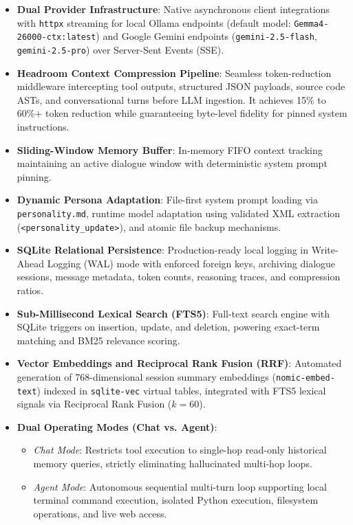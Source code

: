 \begin{itemize}
    \item \textbf{Dual Provider Infrastructure}: Native asynchronous client integrations with \texttt{httpx} streaming for local Ollama endpoints (default model: \texttt{Gemma4-26000-ctx:latest}) and Google Gemini endpoints (\texttt{gemini-2.5-flash}, \texttt{gemini-2.5-pro}) over Server-Sent Events (SSE).
    \item \textbf{Headroom Context Compression Pipeline}: Seamless token-reduction middleware intercepting tool outputs, structured JSON payloads, source code ASTs, and conversational turns before LLM ingestion. It achieves 15\% to 60\%+ token reduction while guaranteeing byte-level fidelity for pinned system instructions.
    \item \textbf{Sliding-Window Memory Buffer}: In-memory FIFO context tracking maintaining an active dialogue window with deterministic system prompt pinning.
    \item \textbf{Dynamic Persona Adaptation}: File-first system prompt loading via \texttt{personality.md}, runtime model adaptation using validated XML extraction (\texttt{<personality\_update>}), and atomic file backup mechanisms.
    \item \textbf{SQLite Relational Persistence}: Production-ready local logging in Write-Ahead Logging (WAL) mode with enforced foreign keys, archiving dialogue sessions, message metadata, token counts, reasoning traces, and compression ratios.
    \item \textbf{Sub-Millisecond Lexical Search (FTS5)}: Full-text search engine with SQLite triggers on insertion, update, and deletion, powering exact-term matching and BM25 relevance scoring.
    \item \textbf{Vector Embeddings and Reciprocal Rank Fusion (RRF)}: Automated generation of 768-dimensional session summary embeddings (\texttt{nomic-embed-text}) indexed in \texttt{sqlite-vec} virtual tables, integrated with FTS5 lexical signals via Reciprocal Rank Fusion ($k=60$).
    \item \textbf{Dual Operating Modes (Chat vs. Agent)}:
    \begin{itemize}
        \item \emph{Chat Mode}: Restricts tool execution to single-hop read-only historical memory queries, strictly eliminating hallucinated multi-hop loops.
        \item \emph{Agent Mode}: Autonomous sequential multi-turn loop supporting local terminal command execution, isolated Python execution, filesystem operations, and live web access.

\end{itemize}
\end{itemize}
